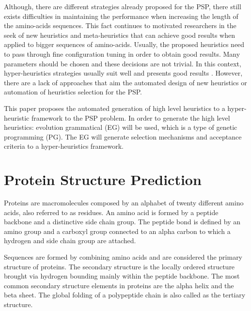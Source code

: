 \documentclass[conference]{IEEEtran}
\begin{document}
Although, there are different strategies already proposed for the PSP,  there still exists difficulties in maintaining the performance when increasing the length of the amino-acids sequences. This fact continues to motivated researchers in the seek of new heuristics and meta-heuristics that can achieve good results when applied to bigger sequences of amino-acids. Usually, the proposed heuristics need to pass through fine configuration tuning in order to obtain good results.  Many parameters should be chosen and these decisions are not trivial. In this context, hyper-heuristics strategies usually suit well and presents good results \cite{burke2013hyper}. However, there are a lack of approaches that aim the automated design of new heuristics or automation of heuristics selection for the PSP.

This paper proposes the automated generation of high level heuristics to a hyper-heuristic framework to the PSP problem. In order to generate the high level heuristics: evolution grammatical (EG) will be used, which is a type of genetic programming (PG). The EG will generate selection mechanisms and acceptance criteria to a hyper-heuristics framework.


\section{Protein Structure Prediction} \label{sec:proteinfolding}


Proteins are macromolecules composed by an alphabet of twenty different amino acids, also referred to as residues. An amino acid is formed by a peptide backbone and a distinctive side chain group. The peptide bond is defined by an amino group and a carboxyl group connected to an alpha carbon to which a hydrogen and side chain group are attached.


Sequences are formed by combining amino acids and are considered the primary structure of
proteins.
The secondary structure is the locally ordered structure brought via hydrogen bounding mainly within the peptide backbone. The most common secondary structure elements in proteins are the alpha helix and the beta sheet. The global folding of a polypeptide chain is also called as the tertiary structure.
\end{document}
